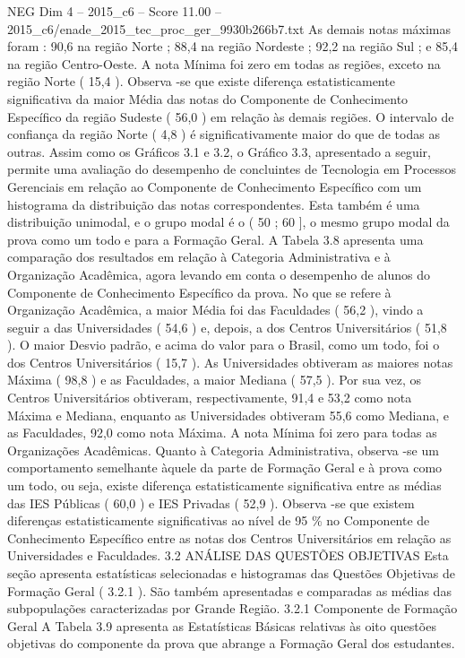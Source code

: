 \begin{textsample}{NEG Dim 4 – 2015\_c6 – Score 11.00 – 2015\_c6/enade\_2015\_tec\_proc\_ger\_9930b266b7.txt}
As demais notas máximas foram : 90,6 na região Norte ; 88,4 na região Nordeste ; 92,2 na região Sul ; e 85,4 na região Centro-Oeste.
A nota Mínima foi zero em todas as regiões, exceto na região Norte ( 15,4 ).
Observa -se que existe diferença estatisticamente significativa da maior Média das notas do Componente de Conhecimento Específico da região Sudeste ( 56,0 ) em relação às demais regiões.
O intervalo de confiança da região Norte ( 4,8 ) é significativamente maior do que de todas as outras.
Assim como os Gráficos 3.1 e 3.2, o Gráfico 3.3, apresentado a seguir, permite uma avaliação do desempenho de concluintes de Tecnologia em Processos Gerenciais em relação ao Componente de Conhecimento Específico com um histograma da distribuição das notas correspondentes.
Esta também é uma distribuição unimodal, e o grupo modal é o ( 50 ; 60 ], o mesmo grupo modal da prova como um todo e para a Formação Geral.
A Tabela 3.8 apresenta uma comparação dos resultados em relação à Categoria Administrativa e à Organização Acadêmica, agora levando em conta o desempenho de alunos do Componente de Conhecimento Específico da prova.
No que se refere à Organização Acadêmica, a maior Média foi das Faculdades ( 56,2 ), vindo a seguir a das Universidades ( 54,6 ) e, depois, a dos Centros Universitários ( 51,8 ).
O maior Desvio padrão, e acima do valor para o Brasil, como um todo, foi o dos Centros Universitários ( 15,7 ).
As Universidades obtiveram as maiores notas Máxima ( 98,8 ) e as Faculdades, a maior Mediana ( 57,5 ).
Por sua vez, os Centros Universitários obtiveram, respectivamente, 91,4 e 53,2 como nota Máxima e Mediana, enquanto as Universidades obtiveram 55,6 como Mediana, e as Faculdades, 92,0 como nota Máxima.
A nota Mínima foi zero para todas as Organizações Acadêmicas.
Quanto à Categoria Administrativa, observa -se um comportamento semelhante àquele da parte de Formação Geral e à prova como um todo, ou seja, existe diferença estatisticamente significativa entre as médias das IES Públicas ( 60,0 ) e IES Privadas ( 52,9 ).
Observa -se que existem diferenças estatisticamente significativas ao nível de 95 \% no Componente de Conhecimento Específico entre as notas dos Centros Universitários em relação as Universidades e Faculdades. 3.2 ANÁLISE DAS QUESTÕES OBJETIVAS Esta seção apresenta estatísticas selecionadas e histogramas das Questões Objetivas de Formação Geral ( 3.2.1 ).
São também apresentadas e comparadas as médias das subpopulações caracterizadas por Grande Região. 3.2.1 Componente de Formação Geral A Tabela 3.9 apresenta as Estatísticas Básicas relativas às oito questões objetivas do componente da prova que abrange a Formação Geral dos estudantes.

\end{textsample}
